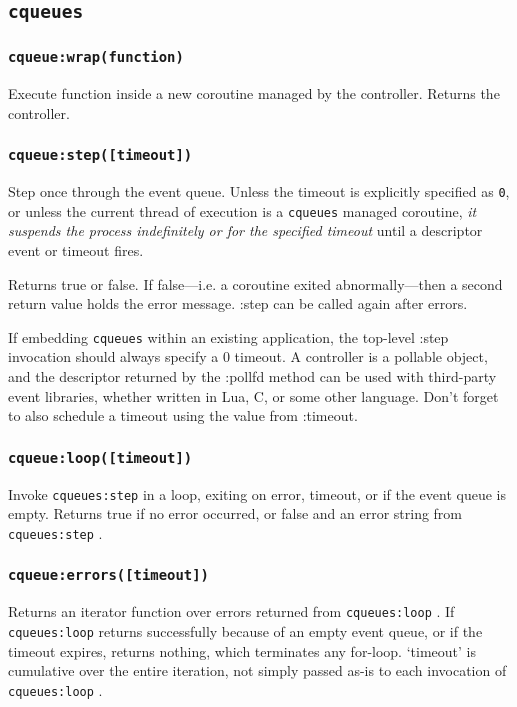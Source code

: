 \documentclass[11pt, oneside]{memoir}
\newcommand{\cqueues}[0]{\texttt{cqueues} }
\newcommand{\routine}[1]{\texttt{#1} }
\newcommand{\method}[1]{\texttt{#1} }
\newcounter{toccols}
\newenvironment{Module}[1]{
	\subsection{\texttt{#1}}
	\addtocontents{toc}{
		\protect\begin{multicols}{\value{toccols}}
	}
}{
	\addtocontents{toc}{\protect\end{multicols}}
}
\begin{document}
\begin{Module}{\cqueues}
\subsubsection[\routine{cqueues:wrap}]{\routine{cqueue:wrap(function)}}
Execute function inside a new coroutine managed by the controller. Returns the controller.

\subsubsection[\routine{cqueues:step}]{\routine{cqueue:step([timeout])}}
Step once through the event queue. Unless the timeout is explicitly specified as \texttt{0}, or unless the current thread of execution is a \cqueues managed coroutine, \emph{it suspends the process indefinitely or for the specified timeout} until a descriptor event or timeout fires.

Returns true or false. If false---i.e. a coroutine exited abnormally---then a second return value holds the error message. :step can be called again after errors.

If embedding \cqueues within an existing application, the top-level :step invocation should always specify a 0 timeout. A controller is a pollable object, and the descriptor returned by the :pollfd method can be used with third-party event libraries, whether written in Lua, C, or some other language. Don't forget to also schedule a timeout using the value from :timeout.


\subsubsection[\routine{cqueues:loop}]{\routine{cqueue:loop([timeout])}}

Invoke \method{cqueues:step} in a loop, exiting on error, timeout, or if the event queue is empty. Returns true if no error occurred, or false and an error string from \method{cqueues:step}.

\subsubsection[\routine{cqueues:errors}]{\routine{cqueue:errors([timeout])}}

Returns an iterator function over errors returned from \routine{cqueues:loop}. If \routine{cqueues:loop} returns successfully because of an empty event queue, or if the timeout expires, returns nothing, which terminates any for-loop. `timeout' is cumulative over the entire iteration, not simply passed as-is to each invocation of \routine{cqueues:loop}.


\end{Module}
\end{document}
